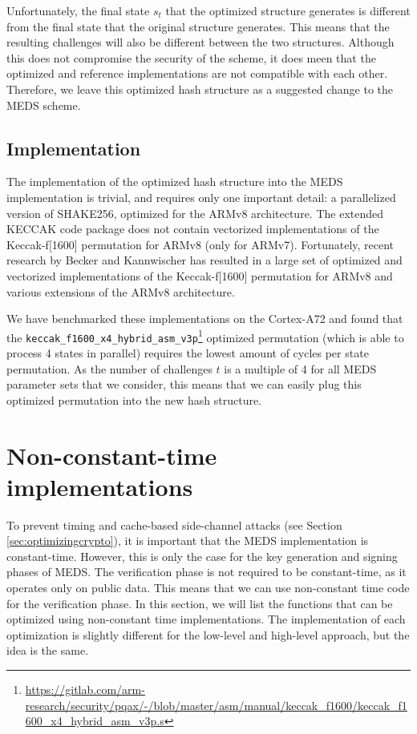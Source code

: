 \documentclass[11pt,a4paper]{report}
\theoremstyle{definition}
\begin{document}
Unfortunately, the final state $s_t$ that the optimized structure generates is different from the final state that the original structure generates. This means that the resulting challenges will also be different between the two structures. Although this does not compromise the security of the scheme, it does meen that the optimized and reference implementations are not compatible with each other. Therefore, we leave this optimized hash structure as a suggested change to the MEDS scheme.

\subsection{Implementation}
The implementation of the optimized hash structure into the MEDS implementation is trivial, and requires only one important detail: a parallelized version of SHAKE256, optimized for the ARMv8 architecture. The extended KECCAK code package \cite{xkcp} does not contain vectorized implementations of the Keccak-f[1600] permutation for ARMv8 (only for ARMv7). Fortunately, recent research by Becker and Kannwischer \cite{becker2022hybrid} has resulted in a large set of optimized and vectorized implementations of the Keccak-f[1600] permutation for ARMv8 and various extensions of the ARMv8 architecture.

We have benchmarked these implementations on the Cortex-A72 and found that the \texttt{keccak\_f1600\_x4\_hybrid\_asm\_v3p}\footnote{\url{https://gitlab.com/arm-research/security/pqax/-/blob/master/asm/manual/keccak\_f1600/keccak\_f1600\_x4\_hybrid\_asm\_v3p.s}} optimized permutation (which is able to process 4 states in parallel) requires the lowest amount of cycles per state permutation. As the number of challenges $t$ is a multiple of 4 for all MEDS parameter sets that we consider, this means that we can easily plug this optimized permutation into the new hash structure.

\section{Non-constant-time implementations}
\label{sec:nonconstanttime}
To prevent timing and cache-based side-channel attacks (see Section \ref{sec:optimizingcrypto}), it is important that the MEDS implementation is constant-time. However, this is only the case for the key generation and signing phases of MEDS. The verification phase is not required to be constant-time, as it operates only on public data. This means that we can use non-constant time code for the verification phase. In this section, we will list the functions that can be optimized using non-constant time implementations. The implementation of each optimization is slightly different for the low-level and high-level approach, but the idea is the same.
\end{document}
